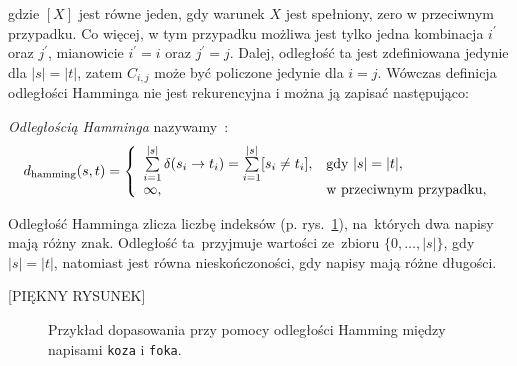 \documentclass{praca1}
\begin{document}
gdzie $[X]$ jest równe jeden, gdy warunek $X$ jest spełniony, zero w przeciwnym przypadku. Co więcej, w tym przypadku możliwa jest tylko jedna kombinacja $i^\prime$ oraz $j^\prime$, mianowicie $i^\prime = i$ oraz $j^\prime = j$. Dalej, odległość ta jest zdefiniowana jedynie dla $|s| = |t|$, zatem $C_{i,j}$ może być policzone jedynie dla $i = j$. Wówczas definicja odległości Hamminga nie jest rekurencyjna i można ją zapisać następująco:


\begin{definition}
\emph{Odległością Hamminga} nazywamy~\cite{Hamming1950:errordetecting}:
$$
d_{\mathrm{hamming}}(s, t) = \left\{
\begin{array}{l l}     
    \sum\limits_{i=1}^{|s|}\delta(s_i \rightarrow t_i) = \sum\limits_{i=1}^{|s|}[s_i\neq t_i], & \text{gdy } |s| = |t|,\\
    \infty, & \text{w przeciwnym przypadku},
\end{array}\right.
$$
\end{definition}

Odległość Hamminga zlicza liczbę indeksów (p. rys.~\ref{rys:002}), na~których dwa napisy mają różny znak. Odległość ta~przyjmuje wartości ze~zbioru $\{0,\ldots,|s|\}$, gdy $|s|=|t|$, natomiast jest równa nieskończoności, gdy napisy mają różne długości.

[PIĘKNY RYSUNEK]


\begin{figure}[width=80pt]
\centering
{}
\cprotect\caption{Przykład dopasowania przy pomocy odległości Hamming między napisami \verb|koza| i \verb|foka|.}\label{rys:002}
\end{figure}
\end{document}
